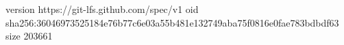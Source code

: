 version https://git-lfs.github.com/spec/v1
oid sha256:36046973525184e76b77c6e03a55b481e132749aba75f0816e0fae783bdbdf63
size 203661
